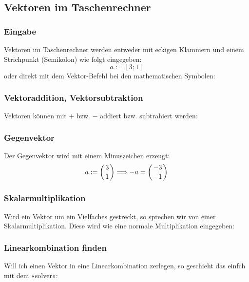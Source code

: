 \subsection{Vektoren im Taschenrechner}

\subsubsection{Eingabe}
Vektoren im Taschenrechner werden entweder mit eckigen Klammern und
einem Strichpunkt (Semikolon) wie folgt eingegeben:
$$a := [3; 1]$$
oder direkt mit dem Vektor-Befehl bei den mathematischen Symbolen:


\subsubsection{Vektoraddition, Vektorsubtraktion}
Vektoren können mit $+$ bzw. $-$ addiert bzw. subtrahiert
werden:

\subsubsection{Gegenvektor}
Der Gegenvektor wird mit einem Minuszeichen erzeugt:
$$a:=\left(3\atop 1\right) \Longrightarrow -a = \left( -3 \atop -1\right)$$

\subsubsection{Skalarmultiplikation}
Wird ein Vektor um ein Vielfaches gestreckt, so sprechen wir von einer
Skalarmultiplikation. Diese wird wie eine normale Multiplikation
eingegeben:


\subsubsection{Linearkombination finden}
Will ich einen Vektor in eine Linearkombination
 zerlegen, so geschieht das einfch mit dem
«solver»:


\newpage
